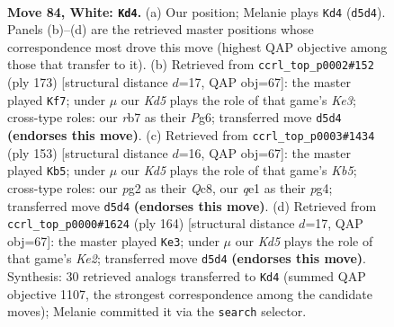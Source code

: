 \documentclass[11pt]{article}
\begin{document}
\clearpage

\begin{figure}[p]\centering
\begin{subfigure}{0.46\textwidth}\centering
\resizebox{\linewidth}{!}{%
\newchessgame
\chessboard[
  setfen={8/1r6/6k1/1q1K4/8/8/6p1/4q3 w - - 2 84},
  showmover=false,
  pgfstyle=straightmove, color=movearrow, markmove={d5-d4}
]}
\caption{}
\end{subfigure}\hfill
\begin{subfigure}{0.46\textwidth}\centering
\resizebox{\linewidth}{!}{%
\newchessgame
\chessboard[
  setfen={8/8/K1Q1k1p1/8/8/1P6/8/4q3 b - - 9 87},
  showmover=false,
  pgfstyle=straightmove, color=movearrow, markmove={e6-f7}
]}
\caption{}
\end{subfigure}
\\[4pt]
\begin{subfigure}{0.46\textwidth}\centering
\resizebox{\linewidth}{!}{%
\newchessgame
\chessboard[
  setfen={2q5/8/6K1/8/1k1Q2P1/8/8/8 b - - 0 77},
  showmover=false,
  pgfstyle=straightmove, color=movearrow, markmove={b4-b5}
]}
\caption{}
\end{subfigure}\hfill
\begin{subfigure}{0.46\textwidth}\centering
\resizebox{\linewidth}{!}{%
\newchessgame
\chessboard[
  setfen={1Q6/8/8/8/8/7k/4K1q1/8 w - - 13 83},
  showmover=false,
  pgfstyle=straightmove, color=movearrow, markmove={e2-e3}
]}
\caption{}
\end{subfigure}
\caption{\textbf{Move 84, White: \texttt{Kd4}.} (a) Our position; Melanie plays \texttt{Kd4} (\texttt{d5d4}). Panels (b)--(d) are the retrieved master positions whose correspondence most drove this move (highest QAP objective among those that transfer to it). (b) Retrieved from \texttt{ccrl\_top\_p0002\#152} (ply 173) [structural distance $d$=17, QAP obj=67]: the master played \texttt{Kf7}; under $\mu$ our \emph{Kd5} plays the role of that game's \emph{Ke3}; cross-type roles: our \emph{r}b7 as their \emph{P}g6; transferred move \texttt{d5d4} \textbf{(endorses this move)}. (c) Retrieved from \texttt{ccrl\_top\_p0003\#1434} (ply 153) [structural distance $d$=16, QAP obj=67]: the master played \texttt{Kb5}; under $\mu$ our \emph{Kd5} plays the role of that game's \emph{Kb5}; cross-type roles: our \emph{p}g2 as their \emph{Q}c8, our \emph{q}e1 as their \emph{p}g4; transferred move \texttt{d5d4} \textbf{(endorses this move)}. (d) Retrieved from \texttt{ccrl\_top\_p0000\#1624} (ply 164) [structural distance $d$=17, QAP obj=67]: the master played \texttt{Ke3}; under $\mu$ our \emph{Kd5} plays the role of that game's \emph{Ke2}; transferred move \texttt{d5d4} \textbf{(endorses this move)}. Synthesis: 30 retrieved analogs transferred to \texttt{Kd4} (summed QAP objective 1107, the strongest correspondence among the candidate moves); Melanie committed it via the \texttt{search} selector.}
\label{fig:thought-m166}
\end{figure}
\end{document}

